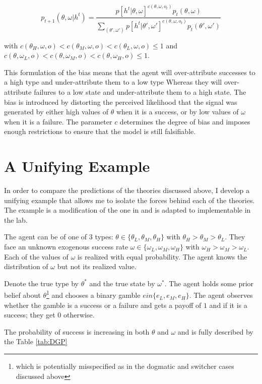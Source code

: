 \documentclass[
  12pt,
]{article}
\begin{document}
\[
p_{t+1}(\theta, \omega| h^t) = \frac{p[h^t|\theta, \omega]^{c(\theta, \omega, o_t)}p_t(\theta, \omega)}{\sum_{(\theta', \omega')}p[h^t|\theta', \omega']^{c(\theta, \omega, o_t)}p_t(\theta', \omega')}
\]

with
\(c(\theta_H, \omega, o)<c(\theta_M, \omega, o)<c(\theta_L, \omega, o)\leq 1\)
and
\(c(\theta, \omega_L, o)<c(\theta, \omega_M, o)<c(\theta, \omega_H, o)\leq 1\).

This formulation of the bias means that the agent will over-attribute
successes to a high type and under-attribute them to a low type Whereas
they will over-attribute failures to a low state and under-attribute
them to a high state. The bias is introduced by distorting the perceived
likelihood that the signal was generated by either high values of
\(\theta\) when it is a success, or by low values of \(\omega\) when it
is a failure. The parameter \(c\) determines the degree of bias and
imposes enough restrictions to ensure that the model is still
falsifiable.

\hypertarget{a-unifying-example}{%
\section{A Unifying Example}\label{a-unifying-example}}

In order to compare the predictions of the theories discussed above, I
develop a unifying example that allows me to isolate the forces behind
each of the theories. The example is a modification of the one in
\citet{Heidhues2018} and is adapted to implementable in the lab.

The agent can be of one of 3 types:
\(\theta \in \{\theta_L, \theta_M, \theta_H\}\) with
\(\theta_H > \theta_M > \theta_L\). They face an unknown exogenous
success rate \(\omega \in \{\omega_L, \omega_M, \omega_H\}\) with
\(\omega_H>\omega_M>\omega_L\). Each of the values of \(\omega\) is
realized with equal probability. The agent knows the distribution of
\(\omega\) but not its realized value.

Denote the true type by \(\theta^*\) and the true state by \(\omega^*\).
The agent holds some prior belief about
\(\theta\)\footnote{which is potentially misspecified as in the dogmatic and switcher cases discussed above}
and chooses a binary gamble \(e in \{e_L, e_M, e_H\}\). The agent
observes whether the gamble is a success or a failure and gets a payoff
of \(1\) and if it is a success; they get \(0\) otherwise.

The probability of success is increasing in both \(\theta\) and
\(\omega\) and is fully described by the Table \ref{tab:DGP}
\end{document}
